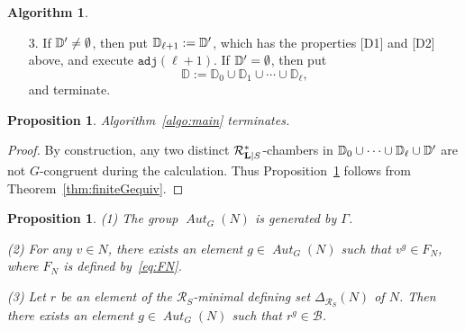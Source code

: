 \documentclass{amsart}
\theoremstyle{plain}
\newtheorem{proposition}[theorem]{Proposition}
\theoremstyle{definition}
\newtheorem{algorithm}[theorem]{Algorithm}
\theoremstyle{remark}
\numberwithin{equation}{section}
\numberwithin{table}{section}
\numberwithin{figure}{section}
\newcommand{\D}{\mathord{\mathbb D}}
\newcommand{\BBB}{\mathord{\mathcal B}}
\newcommand{\RRR}{\mathord{\mathcal R}}
\newcommand{\sprime}{\sp\prime}
\newcommand{\spprime}{\sp{\prime\prime}}
\newcommand{\sperp}{\sp{\perp}}
\newcommand{\dual}{\sp{\vee}}
\renewcommand{\L}{\mathord{\mathbf{L}}}
\newcommand{\aut}{\operatorname{\mathit {Aut}}\nolimits}
\newcommand{\autG}{\aut_G}
\newcommand{\Chams}{\D}
\newcommand{\Roots}{\RRR}
\newcommand{\sphyp}{\sp*}
\newcommand{\procadj}{\mathord{\mathtt{adj}}}
\newcommand{\RtsLS}{\Roots_{\L|S}}
\newcommand{\Nc}{N}
\begin{document}
\begin{algorithm}
\begin{itemize}
\begin{itemize}
\begin{itemize}
a Weyl vector $w\sprime\in {\L}$ of the $\RtsLS\sphyp$-chamber
$D\sprime$ adjacent to $D_{i}$ across the wall $(v)\sperp$
by Algorithm~\ref{algorithm:adjacent}.
We then calculate 
$\Delta_{S\dual}(D\sprime)$ 
 by Algorithm~\ref{algorithm:aSnS}.
Since $(v)\sperp\notin \Roots_S\sphyp$ and $D_i\subset \Nc$,
we have 
$D\sprime\subset \Nc$.
Since $D_i$ is of level $\ell$,
we see that $D\sprime$ is of level $\le \ell+1$.
\item[2-3-2.] 
By Algorithm~\ref{algorithm:Gequiv}, determine whether $D\sprime$ is $G$-congruent to  an $\RtsLS\sphyp$-chamber 
$D\spprime$ in 
$$
\tilde{\Chams}:=\Chams_0\cup\dots\cup \Chams_{\ell}\cup \Chams\sprime=\{D_0, D_1, \dots, D_{l-1}\}
$$
 or not.
If $D\sp{\prime}=D\sp{\prime\prime \, h}$ for some $D\spprime\in \tilde{\Chams}$ and $h\in G$, 
then  append $h$ to $\varGamma$.
If there exist no such $D\spprime\in \tilde{\Chams}$ and $h\in G$, then  
$D\sprime$ represents a new $G$-congruence class and its level is $\ell+1$, and hence we put 
$D_{l}:=D\sprime$, 
append $D_{l}$ to $\Chams\sprime$ and increment $l$ by $1$.
\end{itemize}
\item[2-4.]
For each orbit $o_{\nu}$ such that $o_{\nu}\sphyp\subset \Roots_S\sphyp$,
choose a vector $v\in o_{\nu}$,
find  a positive integer $\alpha$ 
such that $r:=\alpha v \in \Roots_{S}$,
and append $r$ to $\BBB$.
\end{itemize}
\item[3.] If $\Chams\sprime\ne \emptyset$, then 
put $\Chams_{\ell+1}:=\Chams\sprime$, which has the properties [D1] and [D2] above, 
 and  execute $\procadj(\ell+1)$.
If $\Chams\sprime= \emptyset$, then 
put 
$$
\Chams:=\Chams_0\cup \Chams_1\cup\cdots\cup  \Chams_{\ell},
$$
and terminate.
\end{itemize}
%
\end{algorithm}
%
\begin{proposition}\label{prop:terminates}
Algorithm~\ref{algo:main} terminates.
\end{proposition}
%
\begin{proof}
By construction,
any two distinct $\RtsLS\sphyp$-chambers in 
$\Chams_0\cup\dots\cup \Chams_{\ell} \cup \Chams\sprime$ are not $G$-congruent
during the calculation.
Thus Proposition~\ref{prop:terminates} follows from Theorem~\ref{thm:finiteGequiv}.
\end{proof}
%
%
%
%
\begin{proposition}\label{prop:adj}
{\rm (1)} 
The group  $\autG(\Nc)$ is generated by $\varGamma$.

{\rm (2)} 
For any $v\in \Nc$, there exists  an element $g\in \autG(\Nc)$  such that $v^g\in F_{\Nc}$,
where $F_{\Nc}$ is defined by~\eqref{eq:FN}.

{\rm (3)} 
Let $r$ be an element of the $\Roots_S$-minimal defining set $\Delta_{\Roots_S}(\Nc)$
of $\Nc$.
Then there exists  an element $g\in \autG(\Nc)$  such that $r^g\in \BBB$.
\end{proposition}
\end{document}
